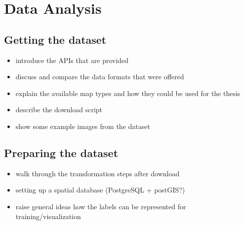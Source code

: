 \section{Data Analysis}

\subsection{Getting the dataset}
\begin{itemize}
    \item introduce the APIs that are provided
    \item discuss and compare the data formats that were offered
    \item explain the available map types and how they could be used for the thesis
    \item describe the download script
    \item show some example images from the dataset
\end{itemize}

\subsection{Preparing the dataset}
\begin{itemize}
    \item walk through the transformation steps after download
    \item setting up a spatial database (PostgreSQL + postGIS?)
    \item raise general ideas how the labels can be represented for training/visualization
\end{itemize}

\newpage
